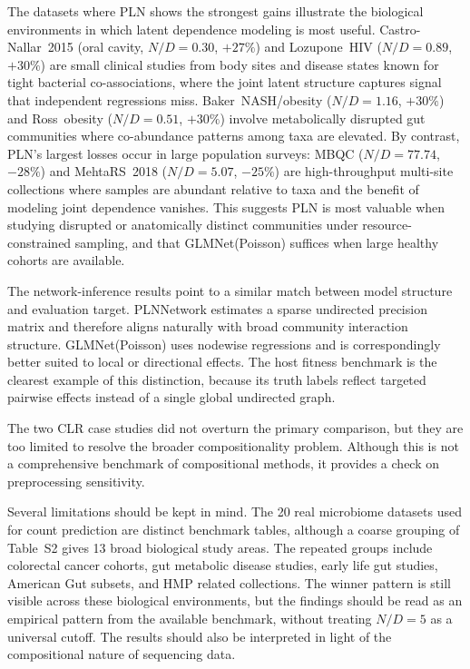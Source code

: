 \documentclass[USenglish]{article}
\theoremstyle{dgthm}
\begin{document}
The datasets where PLN shows the strongest gains illustrate the biological environments in which latent dependence modeling is most useful.
Castro-Nallar~2015 (oral cavity, $N/D = 0.30$, $+27\%$) and Lozupone~HIV ($N/D = 0.89$, $+30\%$) are small clinical studies from body sites and disease states known for tight bacterial co-associations, where the joint latent structure captures signal that independent regressions miss.
Baker~NASH/obesity ($N/D = 1.16$, $+30\%$) and Ross~obesity ($N/D = 0.51$, $+30\%$) involve metabolically disrupted gut communities where co-abundance patterns among taxa are elevated.
By contrast, PLN's largest losses occur in large population surveys: MBQC ($N/D = 77.74$, $-28\%$) and MehtaRS~2018 ($N/D = 5.07$, $-25\%$) are high-throughput multi-site collections where samples are abundant relative to taxa and the benefit of modeling joint dependence vanishes.
This suggests PLN is most valuable when studying disrupted or anatomically distinct communities under resource-constrained sampling, and that GLMNet(Poisson) suffices when large healthy cohorts are available.

The network-inference results point to a similar match between model structure and evaluation target.
PLNNetwork estimates a sparse undirected precision matrix and therefore aligns naturally with broad community interaction structure.
GLMNet(Poisson) uses nodewise regressions and is correspondingly better suited to local or directional effects.
The host fitness benchmark is the clearest example of this distinction, because its truth labels reflect targeted pairwise effects instead of a single global undirected graph.

The two CLR case studies did not overturn the primary comparison, but they are too limited to resolve the broader compositionality problem.
Although this is not a comprehensive benchmark of compositional methods, it provides a check on preprocessing sensitivity.

Several limitations should be kept in mind.
The 20 real microbiome datasets used for count prediction are distinct benchmark tables, although a coarse grouping of Table~S2 gives 13 broad biological study areas.
The repeated groups include colorectal cancer cohorts, gut metabolic disease studies, early life gut studies, American Gut subsets, and HMP related collections.
The winner pattern is still visible across these biological environments, but the findings should be read as an empirical pattern from the available benchmark, without treating $N/D=5$ as a universal cutoff.
The results should also be interpreted in light of the compositional nature of sequencing data.
\end{document}

